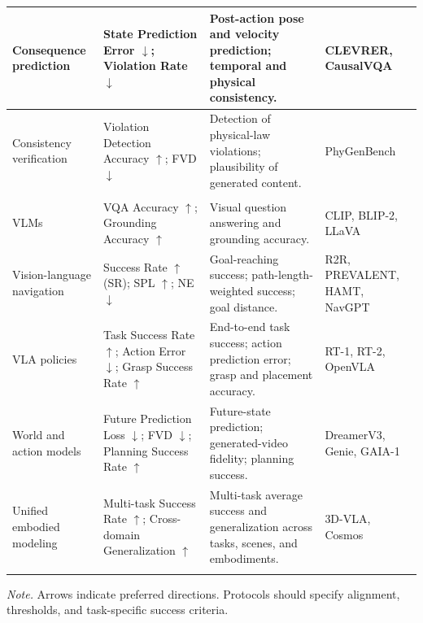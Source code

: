 \documentclass{SCIS2026}
\begin{document}
\begin{table}[!t]
{\begin{tabular}{@{} >{\RaggedRight\arraybackslash}m{2.4cm} >{\RaggedRight\arraybackslash}m{4.6cm} >{\RaggedRight\arraybackslash}m{8.2cm} >{\RaggedRight\arraybackslash}m{3.2cm} @{}}
        \cmidrule[0.25pt](lr){1-4}
        Consequence prediction & State Prediction Error $\downarrow$; Violation Rate $\downarrow$ & Post-action pose and velocity prediction; temporal and physical consistency. & CLEVRER, CausalVQA \\

        \cmidrule[0.25pt](lr){1-4}
        Consistency verification & Violation Detection Accuracy $\uparrow$; FVD $\downarrow$ & Detection of physical-law violations; plausibility of generated content. & PhyGenBench \\

        \arrayrulecolor{TableNavy}
        \cmidrule[0.50pt]{1-4}

        \rowcolor{TableSub}
        \multicolumn{4}{@{}l}{\hspace{0.12em}\textcolor{TableNavy}{\bfseries IV.\;Executable embodied manipulation}}\\[0.6em]
        \arrayrulecolor{GrayRule}

        VLMs & VQA Accuracy $\uparrow$; Grounding Accuracy $\uparrow$ & Visual question answering and grounding accuracy. & CLIP, BLIP-2, LLaVA \\

        \cmidrule[0.25pt](lr){1-4}
        Vision-language navigation & Success Rate $\uparrow$ (SR); SPL $\uparrow$; NE $\downarrow$ & Goal-reaching success; path-length-weighted success; goal distance. & R2R, PREVALENT, HAMT, NavGPT \\

        \cmidrule[0.25pt](lr){1-4}
        VLA policies & Task Success Rate $\uparrow$; Action Error $\downarrow$; Grasp Success Rate $\uparrow$ & End-to-end task success; action prediction error; grasp and placement accuracy. & RT-1, RT-2, OpenVLA \\

        \cmidrule[0.25pt](lr){1-4}
        World and action models & Future Prediction Loss $\downarrow$; FVD $\downarrow$; Planning Success Rate $\uparrow$ & Future-state prediction; generated-video fidelity; planning success. & DreamerV3, Genie, GAIA-1 \\

        \cmidrule[0.25pt](lr){1-4}
        Unified embodied modeling & Multi-task Success Rate $\uparrow$; Cross-domain Generalization $\uparrow$ & Multi-task average success and generalization across tasks, scenes, and embodiments. & 3D-VLA, Cosmos \\

        \arrayrulecolor{TableNavy}
        \bottomrule
        \end{tabular}}
    \par\vspace{2pt}
    {\raggedright\scriptsize\textit{Note.} Arrows indicate preferred directions. Protocols should specify alignment, thresholds, and task-specific success criteria.\par}
\end{table}
\end{document}
